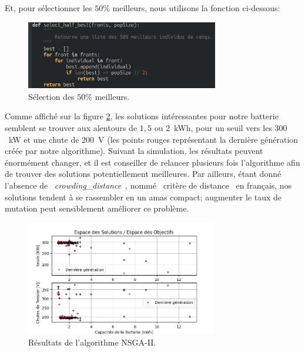 \documentclass[11pt, a4paper, oneside, portrait]{report}
\begin{document}
        Et, pour sélectionner les $50\%{}$ meilleurs, nous utilisons la fonction ci-dessous:

        \begin{figure}[H]
            \centering
            \includegraphics[width=0.75\textwidth]{Figures/select_half_best.png}
            \caption{Sélection des $50\%{}$ meilleurs.}
            \label{fig:non_dominant_sort}
        \end{figure}

        Comme affiché sur la figure \ref{fig:NSGA2}, les solutions intéressantes pour notre batterie semblent se trouver aux alentours de $1,5$ ou $2$~kWh, pour un seuil vers les $300$~kW et une chute de $200$~V (les points rouges représentant la dernière génération créée par notre algorithme).
        Suivant la simulation, les résultats peuvent énormément changer, et il est conseiller de relancer plusieurs fois l'algorithme afin de trouver des solutions potentiellement meilleures.
        Par ailleurs, étant donné l'absence de \guillemotleft{}~\emph{crowding\_distance}~\guillemotright{}, nommé \guillemotleft{}~critère de distance~\guillemotright{} en français, nos solutions tendent à se rassembler en un amas compact; augmenter le taux de mutation peut sensiblement améliorer ce problème.

        \begin{figure}[H]
            \centering
            \includegraphics[width=0.75\textwidth]{Figures/NSGA-II.png}
            \caption{Résultats de l'algorithme NSGA-II.}
            \label{fig:NSGA2}
        \end{figure}
\end{document}
